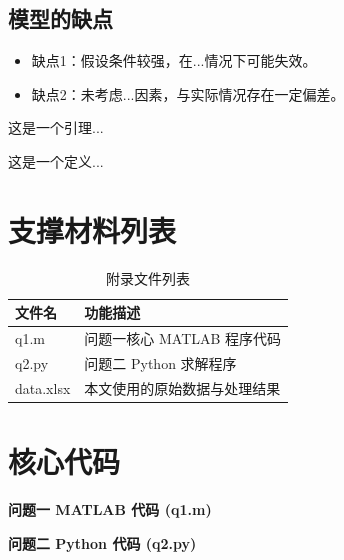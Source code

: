 \documentclass[withoutpreface,notoc]{cumcmthesis}
\begin{document}
	\subsection{模型的缺点}
	\begin{itemize}[itemindent=2em]
		\item 缺点1：假设条件较强，在...情况下可能失效。
		\item 缺点2：未考虑...因素，与实际情况存在一定偏差。
	\end{itemize}



	\begin{lemma}
		这是一个引理...
	\end{lemma}
	\begin{definition}
		这是一个定义...
	\end{definition}
	
	
	\newpage
	\begin{appendices}
		\section{支撑材料列表}
		\begin{table}[H]
			\centering
			\caption{附录文件列表}
			\label{tab:文件列表}
			\begin{tabularx}{\textwidth}{LL}
				\toprule
				文件名 & 功能描述 \\
				\midrule
				q1.m & 问题一核心 MATLAB 程序代码 \\
				q2.py & 问题二 Python 求解程序 \\
				data.xlsx & 本文使用的原始数据与处理结果 \\
				\bottomrule
			\end{tabularx}
		\end{table}
		
		\section{核心代码}
		\noindent\textbf{问题一 MATLAB 代码 (q1.m)}
		
		
		\noindent\textbf{问题二 Python 代码 (q2.py)}
		
		
	\end{appendices}
	
\end{document}
